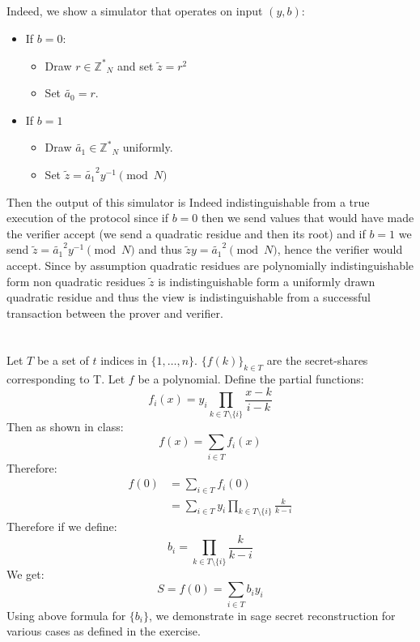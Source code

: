 \documentclass{article}
\begin{document}
\subsection{}%
Indeed, we show a simulator that operates on input $(y,b)$:
\begin{itemize}
\item If $b = 0$:
\begin{itemize}
\item Draw $r\in \mathbb{Z^*}_{N}$ and set $\tilde{z} = r^2$
\item Set $\tilde{a_0} = r$.
\end{itemize}
\item If $b=1$
\begin{itemize}
\item Draw $\tilde{a_1} \in \mathbb{Z^*}_{N}$ uniformly.
\item Set  $\tilde{z} = \tilde{a_1}^2 y^{-1} \pmod{N}$
\end{itemize}
\end{itemize}
Then the output of this simulator is Indeed indistinguishable from a true execution of the protocol since if $b=0$ then we send values that would have made the verifier accept (we send a quadratic residue and then its root) and if $b=1$ we send $\tilde{z} = \tilde{a_1}^2 y^{-1} \pmod{N}$ and thus $\tilde{z}y = \tilde{a_1}^2  \pmod{N}$, hence the verifier would accept. Since by assumption quadratic residues are polynomially indistinguishable form non quadratic residues $\tilde{z}$ is indistinguishable form a uniformly drawn quadratic residue and thus the view is indistinguishable from a successful transaction between the prover and verifier.

\section{}%
Let $T$ be a set of $t$ indices in $\{1,\ldots,n\}$. $\{f(k)\}_{k \in T}$ are the secret-shares corresponding to T. Let $f$ be a polynomial. 
Define the partial functions: \[
f_i(x)=y_i \prod_{k \in T \setminus \{i\}} \frac{x - k}{i - k}
\]
Then as shown in class: \[
f(x) = \sum_{i \in T} f_i(x)
\]
Therefore: \begin{align*}
f(0) &= \sum_{i \in T} f_i(0) \\
     &= \sum_{i \in T} y_i \prod_{k \in T \setminus \{i\}} \frac{k}{k - i}
\end{align*}
Therefore if we define: \[
b_i = \prod_{k \in T \setminus \{i\}} \frac{k}{k - i}
\]
We get: \[
S = f(0) = \sum_{i \in T} b_i y_i
\]
Using above formula for $\{b_i\}$, we demonstrate in sage secret reconstruction for various cases as defined in the exercise.
\end{document}
